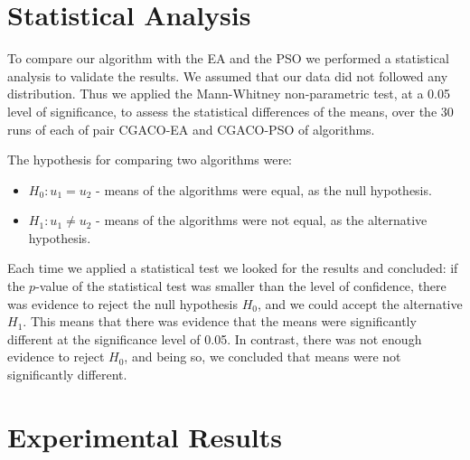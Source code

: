 \section{Statistical Analysis}
To compare our algorithm with the EA and the PSO we performed a statistical analysis to validate the results. We assumed that our data did not followed any distribution. Thus we applied the Mann-Whitney non-parametric test, at a 0.05 level of significance, to assess the statistical differences of the means, over the 30 runs of each of pair CGACO-EA and CGACO-PSO of algorithms.

The hypothesis for comparing two algorithms were:
\begin{itemize}
	\item $H_{0} : u_1 = u_2$ - means of the algorithms were equal, as the null hypothesis.
	\item $H_{1} : u_1 \neq u_2$ - means of the algorithms were not equal, as the alternative hypothesis.
\end{itemize}

Each time we applied a statistical test we looked for the results and concluded: if the $p$-value of the statistical test was smaller than the level of confidence, there was evidence to reject the null hypothesis $H_{0}$, and we could accept the alternative $H_{1}$. This means that there was evidence that the means were significantly different  at the significance level of 0.05. In contrast, there was not enough evidence to reject $H_{0}$, and being so, we concluded that means were not significantly different.



\section{Experimental Results}
